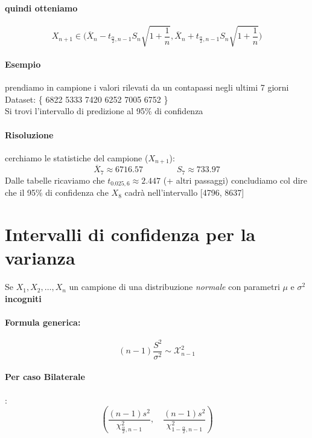 \documentclass[]{article}
\newcommand{\formula}{\paragraph{Formula generica:}}
\begin{document}
    \paragraph{quindi otteniamo}
    $$ X_{n+1} \in \Big(\overline{X}_n-t_{\frac{\alpha}{2}, n-1} S_n\sqrt{1+\frac{1}{n}},\overline{X}_n+t_{\frac{\alpha}{2}, n-1} S_n\sqrt{1+\frac{1}{n}}\Big) $$
    \paragraph{Esempio} prendiamo in campione i valori rilevati da un contapassi negli ultimi 7 giorni \\
    Dataset: \{ 6822 5333 7420 6252 7005 6752 \} \\
    Si trovi l'intervallo di predizione al 95\% di confidenza
    \paragraph{Risoluzione} cerchiamo le statistiche del campione ($X_{n+1}$):
    \[ \overline{X}_7 \approx 6716.57 \qquad \qquad S_7 \approx 733.97 \]
    Dalle tabelle ricaviamo che $t_{0.025,6} \approx 2.447$ (+ altri passaggi) concludiamo col dire che il 95\% di confidenza che $X_8$ cadrà nell'intervallo [4796, 8637]
    \newpage
    \section{Intervalli di confidenza per la varianza} 
    Se $X_1, X_2, \ldots, X_n$ un campione di una distribuzione \textit{normale} con parametri $\mu$ e $\sigma^2$ \textbf{incogniti}
    \formula \[ (n-1) \frac{S^2}{\sigma^2} \sim \mathcal{X}^2_{n-1}  \]
    \paragraph{Per caso Bilaterale}:
    \begin{equation}
        \left(\frac{(n-1) s^2}{\chi_{\frac{\alpha}{2}, n-1}^2}, \quad \frac{(n-1) s^2}{\chi_{1-\frac{\alpha}{2}, n-1}^2}\right)
    \end{equation}
\end{document}

